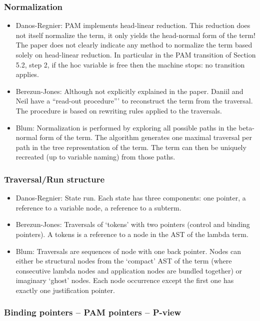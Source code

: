 \documentclass{article}
\theoremstyle{definition}
\begin{document}
\subsubsection{Normalization}

\begin{itemize}
  \item Danos-Regnier: PAM implements head-linear reduction. This reduction does not itself normalize the term, it only yields the head-normal form of the term! The paper does not clearly indicate any method to normalize the term based solely on head-linear reduction.
      In particular in the PAM transition of Section 5.2, step 2, if the hoc variable is free then the machine stops: no transition applies.
  \item Berezun-Jones: Although not explicitly explained in the paper. Daniil and Neil have a ``read-out procedure''' to reconstruct the term from the traversal. The procedure is based on rewriting rules applied to the traversals.
  \item Blum: Normalization is performed by exploring all possible paths in the beta-normal form of the term. The algorithm generates one maximal traversal per path in the tree representation of the term. The term can then be uniquely recreated (up to variable naming) from those paths.
\end{itemize}

\subsubsection{Traversal/Run structure}
\begin{itemize}
\item Danos-Regnier: State run. Each state has three components: one pointer, a reference to a variable node, a reference to a subterm.
\item Berezun-Jones: Traversals of `tokens' with two pointers (control and binding pointers). A tokens is a reference to a node in the AST of the lambda term.
\item Blum: Traversals are sequences of node with one back pointer. Nodes can either be structural nodes from the `compact' AST of the term (where consecutive lambda nodes and application nodes are bundled together) or imaginary `ghost' nodes. Each node occurrence except the first one has exactly one justification pointer.
\end{itemize}

\subsubsection{Binding pointers -- PAM pointers -- P-view}
\end{document}
